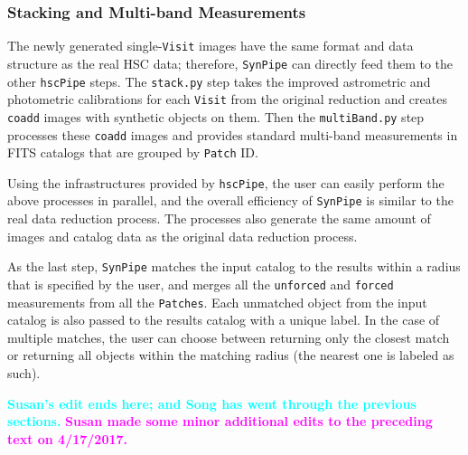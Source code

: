 \documentclass[useamsfonts]{pasj01}
\def\hscpipe{\texttt{hscPipe}}
\def\synpipe{\texttt{SynPipe}}
\def\forced{\texttt{forced}}
\def\coadd{\texttt{coadd}}
\def\unforced{\texttt{unforced}}
\def\visit{\texttt{Visit}}
\newcommand{\song}[1]{\textcolor{cyan} {\textbf{#1}}}
\newcommand{\susan}[1]{\textcolor{magenta} {\textbf{#1}}}
\begin{document}
\subsubsection{Stacking and Multi-band Measurements}
    \label{sssec:multiband}

    The newly generated single-\visit{} images have the same format and data
    structure as the real HSC data; therefore, \synpipe{} can directly feed them
    to the other \hscpipe{} steps.
    The \texttt{stack.py} step takes the improved astrometric and photometric
    calibrations for each \visit{} from the original reduction and creates
    \coadd{}  images with synthetic objects on them.
    Then the \texttt{multiBand.py} step processes these \coadd{}  images and
    provides standard multi-band measurements in FITS catalogs that are grouped by
    \texttt{Patch} ID.

    Using the infrastructures provided by \hscpipe{}, the user can easily perform the 
    above processes in parallel, and the overall efficiency of \synpipe{} is similar to 
    the real data reduction process.
    The processes also generate the same amount of images and catalog data as the 
    original data reduction process.

    As the last step, \synpipe{} matches the input catalog to the results within a
    radius that is specified by the user, and merges all the \unforced{} and
    \forced{} measurements from all the \texttt{Patches}.
    Each unmatched object from the input catalog is also passed to the results catalog 
    with a unique label.
    In the case of multiple matches, the user can choose between returning only the 
    closest match or returning all objects within the matching radius (the nearest one 
    is labeled as such).
    
    \song{Susan's edit ends here; and Song has went through the previous sections.}
    \susan{Susan made some minor additional edits to the preceding text on 4/17/2017.}
\end{document}
